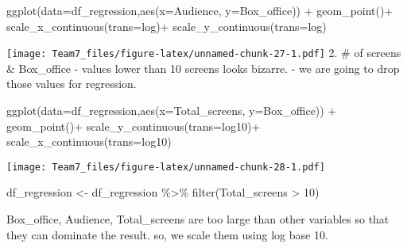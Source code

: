 \documentclass[
]{article}
\newenvironment{Shaded}{\begin{snugshade}}{\end{snugshade}}
\newcommand{\AttributeTok}[1]{\textcolor[rgb]{0.77,0.63,0.00}{#1}}
\newcommand{\DecValTok}[1]{\textcolor[rgb]{0.00,0.00,0.81}{#1}}
\newcommand{\FunctionTok}[1]{\textcolor[rgb]{0.00,0.00,0.00}{#1}}
\newcommand{\NormalTok}[1]{#1}
\newcommand{\OtherTok}[1]{\textcolor[rgb]{0.56,0.35,0.01}{#1}}
\newcommand{\SpecialCharTok}[1]{\textcolor[rgb]{0.00,0.00,0.00}{#1}}
\newcommand{\StringTok}[1]{\textcolor[rgb]{0.31,0.60,0.02}{#1}}
\begin{document}
\begin{Shaded}
\begin{Highlighting}[]
\FunctionTok{ggplot}\NormalTok{(}\AttributeTok{data=}\NormalTok{df\_regression,}\FunctionTok{aes}\NormalTok{(}\AttributeTok{x=}\NormalTok{Audience, }\AttributeTok{y=}\NormalTok{Box\_office)) }\SpecialCharTok{+}
  \FunctionTok{geom\_point}\NormalTok{()}\SpecialCharTok{+}
  \FunctionTok{scale\_x\_continuous}\NormalTok{(}\AttributeTok{trans=}\StringTok{\textquotesingle{}log\textquotesingle{}}\NormalTok{)}\SpecialCharTok{+}
  \FunctionTok{scale\_y\_continuous}\NormalTok{(}\AttributeTok{trans=}\StringTok{\textquotesingle{}log\textquotesingle{}}\NormalTok{)}
\end{Highlighting}
\end{Shaded}

\texttt{[image: Team7\_files/figure-latex/unnamed-chunk-27-1.pdf]} 2. \#
of screens \& Box\_office - values lower than 10 screens looks bizarre.
- we are going to drop those values for regression.

\begin{Shaded}
\begin{Highlighting}[]
\FunctionTok{ggplot}\NormalTok{(}\AttributeTok{data=}\NormalTok{df\_regression,}\FunctionTok{aes}\NormalTok{(}\AttributeTok{x=}\NormalTok{Total\_screens, }\AttributeTok{y=}\NormalTok{Box\_office)) }\SpecialCharTok{+}
  \FunctionTok{geom\_point}\NormalTok{()}\SpecialCharTok{+}
  \FunctionTok{scale\_y\_continuous}\NormalTok{(}\AttributeTok{trans=}\StringTok{\textquotesingle{}log10\textquotesingle{}}\NormalTok{)}\SpecialCharTok{+}
  \FunctionTok{scale\_x\_continuous}\NormalTok{(}\AttributeTok{trans=}\StringTok{\textquotesingle{}log10\textquotesingle{}}\NormalTok{)}
\end{Highlighting}
\end{Shaded}

\texttt{[image: Team7\_files/figure-latex/unnamed-chunk-28-1.pdf]}

\begin{Shaded}
\begin{Highlighting}[]
\NormalTok{df\_regression }\OtherTok{\textless{}{-}}\NormalTok{ df\_regression }\SpecialCharTok{\%\textgreater{}\%}
  \FunctionTok{filter}\NormalTok{(Total\_screens }\SpecialCharTok{\textgreater{}} \DecValTok{10}\NormalTok{)}
\end{Highlighting}
\end{Shaded}

Box\_office, Audience, Total\_screens are too large than other variables
so that they can dominate the result. so, we scale them using log base
10.
\end{document}
